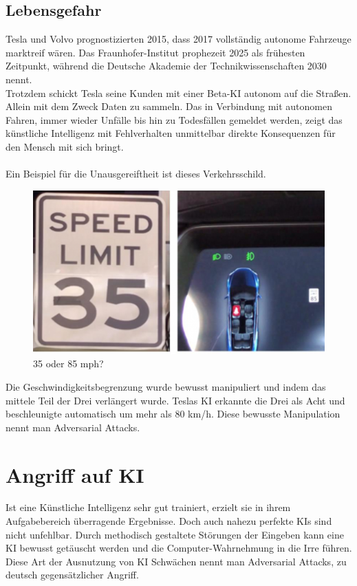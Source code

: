 \documentclass[12pt,oneside,a4paper,parskip]{scrbook}
\begin{document}
\subsection{Lebensgefahr}
Tesla und Volvo prognostizierten 2015, dass 2017 vollständig autonome Fahrzeuge marktreif wären. Das Fraunhofer-Institut prophezeit 2025 als frühesten Zeitpunkt, während die Deutsche Akademie der Technikwissenschaften 2030 nennt. %
\\Trotzdem schickt Tesla seine Kunden mit einer Beta-KI autonom auf die Straßen. Allein mit dem Zweck Daten zu sammeln. Das in Verbindung mit autonomen Fahren, immer wieder Unfälle bis hin zu Todesfällen gemeldet werden, zeigt das künstliche Intelligenz mit Fehlverhalten unmittelbar direkte Konsequenzen für den Mensch mit sich bringt. \\\\
Ein Beispiel für die Unausgereiftheit ist dieses Verkehrsschild.
\begin{figure}[h]
	\begin{center}
		\includegraphics[width=15cm]{Bilder/Tesla_Adversarial_Attack.png}
		\caption{35 oder 85 mph?}
		\label{fig:Verkehrsschild}
	\end{center}
\end{figure}
Die Geschwindigkeitsbegrenzung wurde bewusst manipuliert und indem das mittele Teil der Drei verlängert wurde. Teslas KI erkannte die Drei als Acht und beschleunigte automatisch um mehr als 80 km/h. Diese bewusste Manipulation nennt man Adversarial Attacks.
\section{Angriff auf KI}
Ist eine Künstliche Intelligenz sehr gut trainiert, erzielt sie in ihrem Aufgabebereich überragende Ergebnisse. Doch auch nahezu perfekte KIs sind nicht unfehlbar. Durch methodisch gestaltete Störungen der Eingeben kann eine KI bewusst getäuscht werden und die Computer-Wahrnehmung in die Irre führen. Diese Art der Ausnutzung von KI Schwächen nennt man Adversarial Attacks, zu deutsch gegensätzlicher Angriff.
\end{document}
